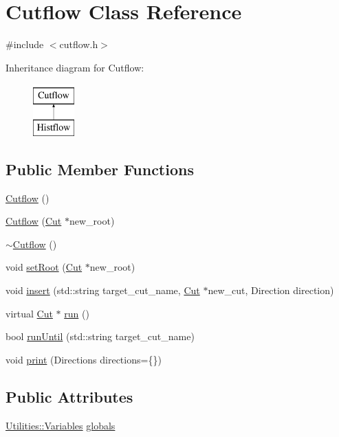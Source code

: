 \hypertarget{classCutflow}{}\section{Cutflow Class Reference}
\label{classCutflow}


{\ttfamily \#include $<$cutflow.\+h$>$}

Inheritance diagram for Cutflow\+:\begin{figure}[H]
\begin{center}
\leavevmode
\includegraphics[height=2.000000cm]{classCutflow}
\end{center}
\end{figure}
\subsection*{Public Member Functions}
\begin{DoxyCompactItemize}
\item 
\hyperlink{classCutflow_a17811cb40a7906fc65e79ce69e3b21be}{Cutflow} ()
\item 
\hyperlink{classCutflow_a943ac94db62104f63499c41b5aa83b4d}{Cutflow} (\hyperlink{classCut}{Cut} $\ast$new\+\_\+root)
\item 
\hyperlink{classCutflow_adb300cd78d57a287934e4d22856a0ffe}{$\sim$\+Cutflow} ()
\item 
void \hyperlink{classCutflow_ad27d37141c3748779a5d81fad919ecbb}{set\+Root} (\hyperlink{classCut}{Cut} $\ast$new\+\_\+root)
\item 
void \hyperlink{classCutflow_a8da46f1053a6b97991489ee0920c29a1}{insert} (std\+::string target\+\_\+cut\+\_\+name, \hyperlink{classCut}{Cut} $\ast$new\+\_\+cut, Direction direction)
\item 
virtual \hyperlink{classCut}{Cut} $\ast$ \hyperlink{classCutflow_a563da4fc41aa5c611dd0ce37ce966f2c}{run} ()
\item 
bool \hyperlink{classCutflow_a3b5a6dc6e9490037d190eca691295859}{run\+Until} (std\+::string target\+\_\+cut\+\_\+name)
\item 
void \hyperlink{classCutflow_a5d9f9fa315303fa9f63738dd41c05042}{print} (Directions directions=\{\})
\end{DoxyCompactItemize}
\subsection*{Public Attributes}
\begin{DoxyCompactItemize}
\item 
\hyperlink{classUtilities_1_1Variables}{Utilities\+::\+Variables} \hyperlink{classCutflow_a71390324488ac6ed4a72c41f4a2c1c10}{globals}
\end{DoxyCompactItemize}
